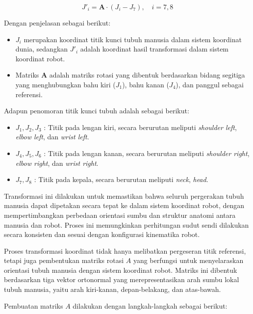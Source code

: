 \begin{equation}
J'_{i} = \mathbf{A} \cdot (J_{i} - J_{7}), \quad i = 7,8
\end{equation}

Dengan penjelasan sebagai berikut:

\begin{itemize}
    \item $J_i$ merupakan koordinat titik kunci tubuh manusia dalam sistem koordinat dunia, sedangkan $J'_i$ adalah koordinat hasil transformasi dalam sistem koordinat robot.
    \item Matriks $\mathbf{A}$ adalah matriks rotasi yang dibentuk berdasarkan bidang segitiga yang menghubungkan bahu kiri ($J_1$), bahu kanan ($J_4$), dan panggul sebagai referensi.
\end{itemize}

Adapun penomoran titik kunci tubuh adalah sebagai berikut:

\begin{itemize}
    \item $J_{1}, J_{2}, J_{3}$ : Titik pada {lengan kiri}, secara berurutan meliputi \textit{shoulder left}, \textit{elbow left}, dan \textit{wrist left}.
    \item $J_{4}, J_{5}, J_{6}$ : Titik pada {lengan kanan}, secara berurutan meliputi \textit{shoulder right}, \textit{elbow right}, dan \textit{wrist right}.
    \item $J_{7}, J_{8}$ : Titik pada {kepala}, secara berurutan meliputi \textit{neck}, \textit{head}.
\end{itemize}

Transformasi ini dilakukan untuk memastikan bahwa seluruh pergerakan tubuh manusia dapat dipetakan secara tepat ke dalam sistem koordinat robot, dengan mempertimbangkan perbedaan orientasi sumbu dan struktur anatomi antara manusia dan robot. Proses ini memungkinkan perhitungan sudut sendi dilakukan secara konsisten dan sesuai dengan konfigurasi kinematika robot.

Proses transformasi koordinat tidak hanya melibatkan pergeseran titik referensi, tetapi juga pembentukan matriks rotasi $A$ yang berfungsi untuk menyelaraskan orientasi tubuh manusia dengan sistem koordinat robot. Matriks ini dibentuk berdasarkan tiga vektor ortonormal yang merepresentasikan arah sumbu lokal tubuh manusia, yaitu arah kiri-kanan, depan-belakang, dan atas-bawah.

Pembuatan matriks $A$ dilakukan dengan langkah-langkah sebagai berikut:

